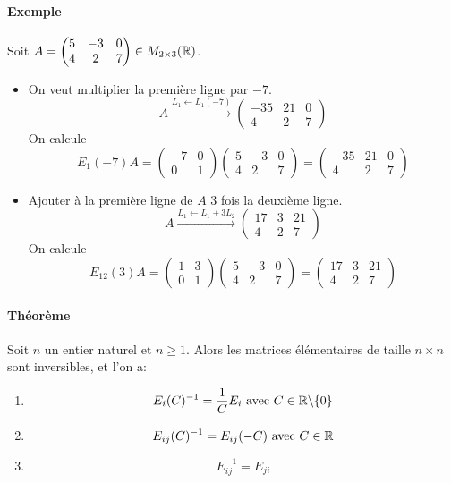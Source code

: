 \paragraph{Exemple} Soit $A = \begin{pmatrix} 5 & -3 & 0 \\ 4 & 2 & 7 \end{pmatrix} \in M_{2 \times 3}(\mathbb{R})$. 
\begin{itemize}
  \item On veut multiplier la première ligne par $-7$.
    $$A \xrightarrow {L_1 \leftarrow L_1(-7)} 
    \begin{pmatrix} -35 & 21 & 0 \\ 4 & 2 & 7 \end{pmatrix}$$
    On calcule
    $$E_1(-7) A 
      = \begin{pmatrix} -7 & 0 \\ 0 & 1 \end{pmatrix} \begin{pmatrix} 5 & -3 & 0 \\ 4 & 2 & 7 \end{pmatrix} 
      = \begin{pmatrix} -35 & 21 & 0 \\ 4 & 2 & 7 \end{pmatrix}$$

  \item Ajouter à la première ligne de $A$ $3$ fois la deuxième ligne.
    $$A \xrightarrow{L_1\leftarrow L_1+3L_2} 
      \begin{pmatrix} 17 & 3 & 21 \\ 4 & 2 & 7 \end{pmatrix}$$
    On calcule
    $$E_{1 2}(3) A 
      = \begin{pmatrix} 1 & 3 \\ 0 & 1 \end{pmatrix} \begin{pmatrix} 5 & -3 & 0 \\ 4 & 2 & 7 \end{pmatrix} 
      = \begin{pmatrix} 17 & 3 & 21 \\ 4 & 2 & 7 \end{pmatrix}$$
\end{itemize}

\paragraph{Théorème} Soit $n$ un entier naturel et $n \geq 1$. Alors les matrices élémentaires de taille $n \times n$ sont inversibles, et l'on a:
\begin{enumerate}
  \item $$E_i(C)^{-1} = \frac{1}{C} E_i \text{ avec } C \in \mathbb{R} \backslash \{ 0 \}$$
  \item $$E_{i j}(C)^{-1} = E_{i j}(-C) \text{ avec } C \in \mathbb{R}$$
  \item $$E_{i j}^{-1} = E_{j i}$$
\end{enumerate}

